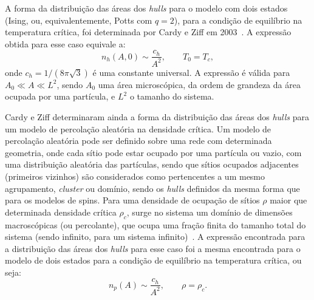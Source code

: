 A forma da distribuição das áreas dos \textit{hulls} para o modelo com dois estados (Ising, ou, equivalentemente, Potts com $q=2$), para a condição de equilíbrio na temperatura crítica, foi determinada por Cardy e Ziff em 2003~\cite{Cardy2003}. A expressão obtida para esse caso equivale a:
\begin{equation}
 \label{eq.hq2t0Tc}
 n_h(A,0) \sim \frac{c_h}{A^2}, \qquad T_0 = T_c,
\end{equation}
onde $c_h = 1/(8\pi\sqrt{3})$ é uma constante universal. A expressão é válida para $A_0 \ll A \ll L^2$, sendo $A_0$ uma área microscópica, da ordem de grandeza da área ocupada por uma partícula, e $L^2$ o tamanho do sistema.

Cardy e Ziff determinaram ainda a forma da distribuição das áreas dos \textit{hulls} para um modelo de percolação aleatória na densidade crítica. Um modelo de percolação aleatória pode ser definido sobre uma rede com determinada geometria, onde cada sítio pode estar ocupado por uma partícula ou vazio, com uma distribuição aleatória das partículas, sendo que sítios ocupados adjacentes (primeiros vizinhos) são considerados como pertencentes a um mesmo agrupamento, \textit{cluster} ou domínio, sendo os \textit{hulls} definidos da mesma forma que para os modelos de spins. Para uma densidade de ocupação de sítios $\rho$ maior que determinada densidade crítica $\rho_c$, surge no sistema um domínio de dimensões macroscópicas (ou percolante), que ocupa uma fração finita do tamanho total do sistema (sendo infinito, para um sistema infinito)~\cite{Stauffer}. A expressão encontrada para a distribuição das áreas dos \textit{hulls} para esse caso foi a mesma encontrada para o modelo de dois estados para a condição de equilíbrio na temperatura crítica, ou seja:
\begin{equation}
 \label{eq.nrandperc}
 n_p(A) \sim \frac{c_h}{A^2}, \qquad \rho = \rho_c.
\end{equation}

